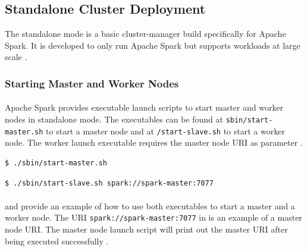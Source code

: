 \subsection{Standalone Cluster Deployment}
\label{subsec:04_spark_standalone}
The standalone mode is a basic cluster-manager build specifically for Apache Spark. It is developed to only run Apache Spark but supports workloads at large scale \cite{Chambers2018Spark}.


\subsubsection{Starting Master and Worker Nodes}
\paragraph{}Apache Spark provides executable launch scripts to start master and worker nodes in standalone mode.
The executables can be found at \texttt{sbin/start-master.sh} to start a master node and at \texttt{/start-slave.sh} to start a worker node.
The worker launch executable requires the master node URI as parameter \cite{Apache2020Spark}. 


\begin{lstlisting}[label=lst:04_spark_standalone_launch-master, caption=Usage of master launch script, language=bash]
$ ./sbin/start-master.sh
\end{lstlisting}


\begin{lstlisting}[label=lst:04_spark_standalone_launch-worker, caption=Usage of worker launch script, language=bash]
$ ./sbin/start-slave.sh spark://spark-master:7077
\end{lstlisting}


\paragraph{} and  provide an example of how to use both executables to start a master and a worker node. The URI \texttt{spark://spark-master:7077} in  is an example of a master node URI. The master node launch script will print out the master URI after being executed successfully \cite{Apache2020Spark}.


